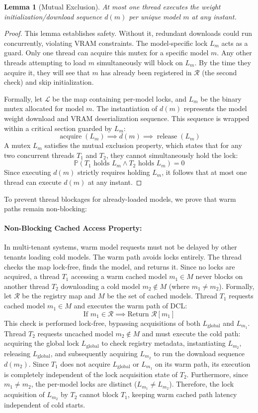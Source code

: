 \documentclass[11pt,a4paper]{article}
\theoremstyle{plain}
\newtheorem{lemma}[theorem]{Lemma}
\theoremstyle{definition}
\theoremstyle{remark}
\newcommand{\Prob}{\mathbb{P}}
\newcommand{\Lm}{L_m}
\newcommand{\Lg}{L_{\mathrm{global}}}
\begin{document}
\begin{lemma}[Mutual Exclusion]\label{lem:mutex}
At most one thread executes the weight initialization/download sequence $d(m)$ per unique model $m$ at any instant.
\end{lemma}
\begin{proof}
This lemma establishes safety. Without it, redundant downloads could run concurrently, violating VRAM constraints. The model-specific lock $\Lm$ acts as a guard. Only one thread can acquire this mutex for a specific model $m$. Any other threads attempting to load $m$ simultaneously will block on $\Lm$. By the time they acquire it, they will see that $m$ has already been registered in $\mathcal{R}$ (the second check) and skip initialization.

Formally, let $\mathcal{L}$ be the map containing per-model locks, and $\Lm$ be the binary mutex allocated for model $m$. The instantiation of $d(m)$ represents the model weight download and VRAM deserialization sequence. This sequence is wrapped within a critical section guarded by $\Lm$:
$$\operatorname{acquire}(\Lm) \implies d(m) \implies \operatorname{release}(\Lm)$$
A mutex $\Lm$ satisfies the mutual exclusion property, which states that for any two concurrent threads $T_1$ and $T_2$, they cannot simultaneously hold the lock:
$$\Prob(T_1 \text{ holds } \Lm \land T_2 \text{ holds } \Lm) = 0$$
Since executing $d(m)$ strictly requires holding $\Lm$, it follows that at most one thread can execute $d(m)$ at any instant.
\end{proof}

To prevent thread blockages for already-loaded models, we prove that warm paths remain non-blocking:

\paragraph{Non-Blocking Cached Access Property:}\label{para:noblocking}
In multi-tenant systems, warm model requests must not be delayed by other tenants loading cold models. The warm path avoids locks entirely. The thread checks the map lock-free, finds the model, and returns it. Since no locks are acquired, a thread $T_1$ accessing a warm cached model $m_1 \in M$ never blocks on another thread $T_2$ downloading a cold model $m_2 \notin M$ (where $m_1 \neq m_2$).
Formally, let $\mathcal{R}$ be the registry map and $M$ be the set of cached models. Thread $T_1$ requests cached model $m_1 \in M$ and executes the warm path of DCL:
$$\text{If } m_1 \in \mathcal{R} \implies \text{Return } \mathcal{R}[m_1]$$
This check is performed lock-free, bypassing acquisitions of both $\Lg$ and $L_{m_1}$. Thread $T_2$ requests uncached model $m_2 \notin M$ and must execute the cold path: acquiring the global lock $\Lg$ to check registry metadata, instantiating $L_{m_2}$, releasing $\Lg$, and subsequently acquiring $L_{m_2}$ to run the download sequence $d(m_2)$.
Since $T_1$ does not acquire $\Lg$ or $L_{m_1}$ on its warm path, its execution is completely independent of the lock acquisition state of $T_2$. Furthermore, since $m_1 \ne m_2$, the per-model locks are distinct ($L_{m_1} \ne L_{m_2}$). Therefore, the lock acquisition of $L_{m_2}$ by $T_2$ cannot block $T_1$, keeping warm cached path latency independent of cold starts.
\end{document}
